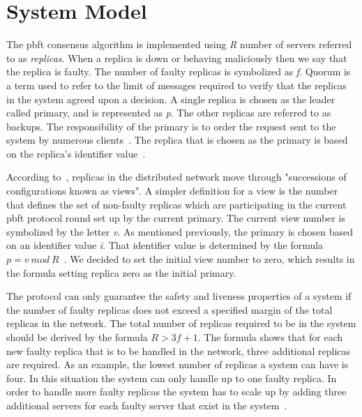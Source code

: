 \section{System Model}
\label{sec:systemModel}
\iffalse
The \ac{pbft} consensus algorithm is implemented using \emph{R} number of servers referred to as \emph{replicas}. When a replica is down or behaving maliciously then we say that the replica is faulty. The number of faulty replicas is symbolized as \emph{f}.
Quorum is a term used to refer to the limit of messages required to verify that the replicas in the system agreed upon a decision\cites[p.~408-409]{PAPER:PBFTRecovery}. %
A single replica is chosen as the leader called primary, and is represented as \emph{p}. The other replicas are referred to as backups. The responsibility of the primary is to order the request sent to the system by numerous clients~\cites[p.~456]{BOOK:MVstandver3}[p.~405]{PAPER:PBFTRecovery}. The replica that is chosen as the primary is based on the replica's identifier value~\cite[p.~258]{BOOK:BuildDepDistSyst}.

According to~\cites[p.~3]{PAPER:OGPBFT}[p.~405]{PAPER:PBFTRecovery}, replicas in the distributed network move through "successions of configurations known as views". A simpler definition for a view is the number that defines the set of non-faulty replicas which are participating in the current \ac{pbft} protocol round set up by the current primary. The current view number is symbolized by the letter \emph{v}.
As mentioned previously, the primary is chosen based on an identifier value \emph{i}. That identifier value is determined by the formula $p = v ~mod~ R$~\cites[p.~258]{BOOK:BuildDepDistSyst}[p.~3]{PAPER:OGPBFT}{SLIDES:PBFT}.
We decided to set the initial view number to zero, which results in the formula setting replica zero as the initial primary.

The protocol can only guarantee the safety and liveness properties of a system if the number of faulty replicas does not exceed a specified margin of the total replicas in the network. The total number of replicas required to be in the system should be derived by the formula $R > 3f + 1$.
The formula shows that for each new faulty replica that is to be handled in the network, three additional replicas are required. As an example, the lowest number of replicas a system can have is four. In this situation the system can only handle up to one faulty replica. In order to handle more faulty replicas the system has to scale up by adding three additional servers for each faulty server that exist in the system~\cites[p.~257]{BOOK:BuildDepDistSyst}[p.~403]{PAPER:PBFTRecovery}{SLIDES:PBFT}[p.~3]{PAPER:OGPBFT}.

